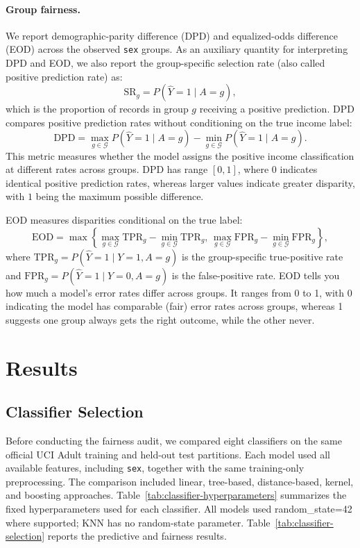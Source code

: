 \documentclass{article}
\begin{document}
\paragraph{Group fairness.}
We report demographic-parity difference (DPD) and equalized-odds difference
(EOD) across the observed \texttt{sex} groups. As an auxiliary quantity for
interpreting DPD and EOD, we also report the group-specific selection rate
(also called positive prediction rate) as:
\[
  \mathrm{SR}_g=P(\widehat{Y}=1\mid A=g),
\]
which is the proportion of records in group \(g\) receiving a positive
prediction. DPD compares positive
prediction rates without conditioning on the true income label:
\[
  \mathrm{DPD}
  = \max_{g\in\mathcal{G}} P(\widehat{Y}=1\mid A=g)
    - \min_{g\in\mathcal{G}} P(\widehat{Y}=1\mid A=g).
\]
This metric measures whether the model
assigns the positive income classification at different rates across groups.
DPD has range \([0,1]\), where \(0\) indicates identical positive prediction rates,
whereas larger values indicate greater disparity, with \(1\) being the
maximum possible difference.

EOD measures disparities conditional on the true label:
\[
  \mathrm{EOD}
  = \max\left\{
      \max_{g\in\mathcal{G}}\mathrm{TPR}_g
        - \min_{g\in\mathcal{G}}\mathrm{TPR}_g,\,
      \max_{g\in\mathcal{G}}\mathrm{FPR}_g
        - \min_{g\in\mathcal{G}}\mathrm{FPR}_g
    \right\},
\]
where \(\mathrm{TPR}_g=P(\widehat{Y}=1\mid Y=1,A=g)\) is the group-specific
true-positive rate and
\(\mathrm{FPR}_g=P(\widehat{Y}=1\mid Y=0,A=g)\) is the false-positive rate.
EOD tells you how much a model's error rates differ across groups.
It ranges from 0 to 1, with 0 indicating the model has comparable (fair)
error rates across groups, whereas 1 suggests one group always gets the right
outcome, while the other never.

\section{Results}\label{sec:result}

\subsection{Classifier Selection}

Before conducting the fairness audit, we compared eight classifiers on the same
official UCI Adult training and held-out test partitions. Each model used all
available features, including \texttt{sex}, together with the same
training-only preprocessing. The comparison included linear, tree-based,
distance-based, kernel, and boosting approaches. Table~\ref{tab:classifier-hyperparameters} summarizes the fixed
hyperparameters used for each classifier. All models used
random\_state=42 where supported; KNN has no random-state parameter.
Table~\ref{tab:classifier-selection} reports the predictive and fairness results.
\end{document}
